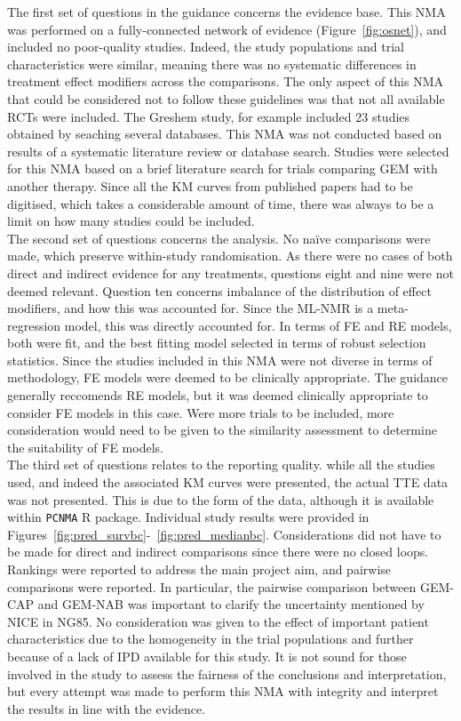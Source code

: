 The first set of questions in the guidance concerns the evidence base. This NMA was performed on a fully-connected network of evidence (Figure~\ref{fig:osnet}), and included no poor-quality studies. Indeed, the study populations and trial characteristics were similar, meaning there was no systematic differences in treatment effect modifiers across the comparisons. The only aspect of this NMA that could be considered not to follow these guidelines was that not all available RCTs were included. The Greshem study, for example included 23 studies obtained by seaching several databases. This NMA was not conducted based on results of a systematic literature review or database search. Studies were selected for this NMA based on a brief literature search for trials comparing GEM with another therapy. Since all the KM curves from published papers had to be digitised, which takes a considerable amount of time, there was always to be a limit on how many studies could be included. \\

The second set of questions concerns the analysis. No na\"ive comparisons were made, which preserve within-study randomisation. As there were no cases of both direct and indirect evidence for any treatments, questions eight and nine were not deemed relevant. Question ten concerns imbalance of the distribution of effect modifiers, and how this was accounted for. Since the ML-NMR is a meta-regression model, this was directly accounted for. In terms of FE and RE models, both were fit, and the best fitting model selected in terms of robust selection statistics. Since the studies included in this NMA were not diverse in terms of methodology, FE models were deemed to be clinically appropriate. The guidance generally reccomends RE models, but it was deemed clinically appropriate to consider FE models in this case. Were more trials to be included, more consideration would need to be given to the similarity assessment to determine the suitability of FE models. \\

The third set of questions relates to the reporting quality. while all the studies used, and indeed the associated KM curves were presented, the actual TTE data was not presented. This is due to the form of the data, although it is available within \verb|PCNMA| R package. Individual study results were provided in Figures~\ref{fig:pred_survbc}-~\ref{fig:pred_medianbc}. Considerations did not have to be made for direct and indirect comparisons since there were no closed loops. Rankings were reported to address the main project aim, and pairwise comparisons were reported. In particular, the pairwise comparison between GEM-CAP and GEM-NAB was important to clarify the uncertainty mentioned by NICE in NG85. No consideration was given to the effect of important patient characteristics due to the homogeneity in the trial populations and further because of a lack of IPD available for this study. It is not sound for those involved in the study to assess the fairness of the conclusions and interpretation, but every attempt was made to perform this NMA with integrity and interpret the results in line with the evidence. \\

